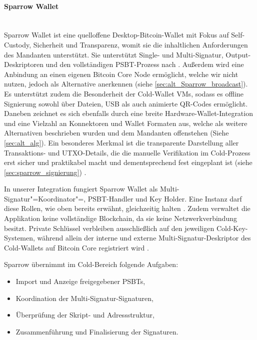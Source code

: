 \paragraph{Sparrow Wallet} \mbox{}\\
Sparrow Wallet ist eine quelloffene Desktop-Bitcoin-Wallet mit Fokus auf Self-Custody, Sicherheit und Transparenz, womit sie die inhaltlichen Anforderungen des Mandanten unterstützt. Sie unterstützt Single- und Multi-Signatur, Output-Deskriptoren und
den vollständigen \ac{PSBT}-Prozess nach \cite{bip174}. 
Außerdem wird eine Anbindung an einen eigenen Bitcoin Core Node ermöglicht, welche wir nicht nutzen, jedoch als Alternative anerkennen (siehe \ref{sec:alt_Sparrow_broadcast}). 
Es unterstützt zudem die Besonderheit der Cold-Wallet \acp{VM}, sodass es offline Signierung sowohl über Dateien, \ac{USB} als auch animierte \ac{QR}-Codes ermöglicht. Daneben zeichnet es sich ebenfalls durch eine breite Hardware-Wallet-Integration und eine Vielzahl an Konnektoren und Wallet Formaten aus, welche als weitere Alternativen beschrieben wurden und dem Mandanten offenstehen (Siehe \ref{sec:alt_alg}).
Ein besonderes Merkmal ist die transparente Darstellung aller Transaktions- und \ac{UTXO}-Details, die die manuelle Verifikation im Cold-Prozess erst sicher und praktikabel macht und dementsprechend fest eingeplant ist (siehe \ref{sec:sparrow_signierung}) \cite{sparrow_docs,Sparrow_Wallets_Features}.

In unserer Integration fungiert Sparrow Wallet als Multi-Signatur"=Koordinator"=, \ac{PSBT}-Handler und Key Holder. Eine Instanz darf diese Rollen, wie oben bereits erwähnt, gleichzeitig halten \cite{sparrow_docs,sparrow_multisig}.
Zudem verwaltet die Applikation keine vollständige Blockchain, da sie keine Netzwerkverbindung besitzt. Private Schlüssel verbleiben ausschließlich auf den jeweiligen Cold-Key-Systemen, während allein der interne und externe Multi-Signatur-Deskriptor des Cold-Wallets auf Bitcoin Core registriert wird \cite{sparrow_multisig, airgap_psbt_guide}.

Sparrow übernimmt im Cold-Bereich folgende Aufgaben:
\begin{itemize}
  \item Import und Anzeige freigegebener \acp{PSBT},
  \item Koordination der Multi-Signatur-Signaturen,
  \item Überprüfung der Skript- und Adressstruktur,
  \item Zusammenführung und Finalisierung der Signaturen.
\end{itemize}

